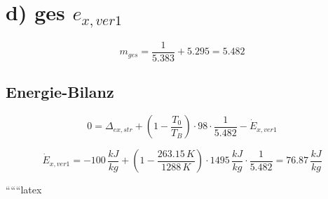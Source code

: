 \section*{d) ges $e_{x,ver1}$}

\[
m_{ges} = \frac{1}{5.383} + 5.295 = 5.482
\]

\subsection*{Energie-Bilanz}

\[
0 = \Delta_{ex,str} + \left( 1 - \frac{T_0}{T_B} \right) \cdot 98 \cdot \frac{1}{5.482} - \dot{E}_{x,ver1}
\]

\[
\dot{E}_{x,ver1} = -100 \, \frac{kJ}{kg} + \left( 1 - \frac{263.15 \, K}{1288 \, K} \right) \cdot 1495 \, \frac{kJ}{kg} \cdot \frac{1}{5.482} = 76.87 \, \frac{kJ}{kg}
\]

``````latex
